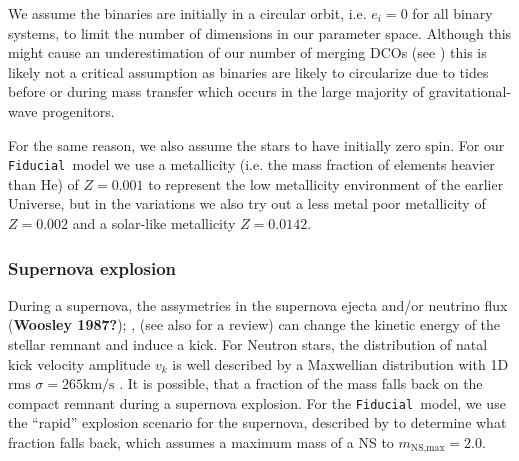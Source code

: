 \documentclass[a4paper,fleqn,usenatbib]{mnras}
\newcommand{\floor}[1]{\textbf{\textcolor{ochre}{#1}}}
\newcommand\Fiducial{\texttt{Fiducial }}
\begin{document}
We assume the binaries are initially in a circular orbit, i.e. $e_i = 0$ for all binary systems, to limit the number of dimensions in our parameter space. Although this might cause an underestimation of our number of merging DCOs (see \citealt{de2015merger}) this is likely not a critical assumption as binaries are likely to circularize due to tides before or during mass transfer \citep{portegies1996population, hurley2002evolution}  which occurs in the large majority of gravitational-wave progenitors. 

For the same reason, we also assume the stars to have initially zero spin. For our \Fiducial model we use a metallicity (i.e. the mass fraction of elements heavier than He) of $Z = 0.001$ to represent the low metallicity environment of the earlier Universe, but in the variations we also try out a less metal poor metallicity of $Z=0.002$ and a solar-like metallicity $Z = 0.0142$. 

 


%



%
%



\subsubsection{Supernova explosion}
During a supernova, the assymetries in the supernova ejecta \citep{janka1994neutron,  burrows1996pulsar}  and/or neutrino flux (\floor{Woosley 1987?}); \citep{bisnovatyi1993asymmetric, socrates2005neutrino}, (see also \citealt{janka2012explosion} for a review) can change the kinetic energy of the stellar remnant and induce a kick.  
For Neutron stars, the distribution of natal kick velocity amplitude $v_k$ is well described by a Maxwellian distribution with 1D rms $\sigma = 265 \mathrm{ km/s}$ \citep{hobbs2005statistical}. It is possible, that a fraction of the mass falls back on the compact remnant during a supernova explosion. For the \Fiducial model, we use the ``rapid'' explosion scenario for the supernova, described by \citep{fryer2012compact} to determine what fraction falls back, which assumes a maximum mass of a NS to $m_{\text{NS,max}} = 2.0 $.
\end{document}
